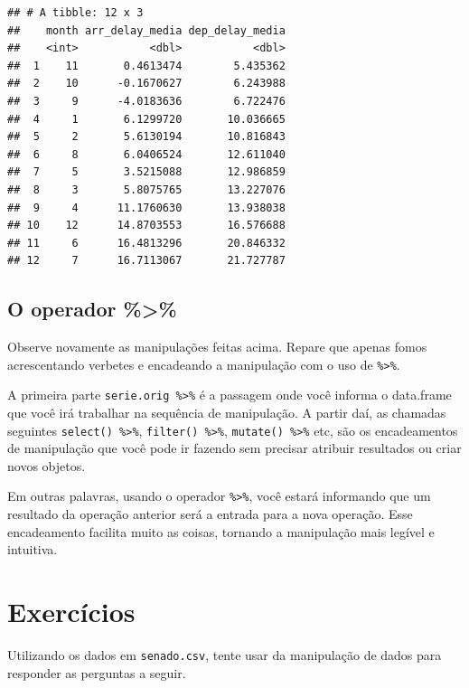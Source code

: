 \documentclass[]{book}
\begin{document}
\begin{verbatim}
## # A tibble: 12 x 3
##    month arr_delay_media dep_delay_media
##    <int>           <dbl>           <dbl>
##  1    11       0.4613474        5.435362
##  2    10      -0.1670627        6.243988
##  3     9      -4.0183636        6.722476
##  4     1       6.1299720       10.036665
##  5     2       5.6130194       10.816843
##  6     8       6.0406524       12.611040
##  7     5       3.5215088       12.986859
##  8     3       5.8075765       13.227076
##  9     4      11.1760630       13.938038
## 10    12      14.8703553       16.576688
## 11     6      16.4813296       20.846332
## 12     7      16.7113067       21.727787
\end{verbatim}

\subsection{O operador \%\textgreater{}\%}\label{o-operador}

Observe novamente as manipulações feitas acima. Repare que apenas fomos
acrescentando verbetes e encadeando a manipulação com o uso de
\texttt{\%\textgreater{}\%}.

A primeira parte \texttt{serie.orig\ \%\textgreater{}\%} é a passagem
onde você informa o data.frame que você irá trabalhar na sequência de
manipulação. A partir daí, as chamadas seguintes
\texttt{select()\ \%\textgreater{}\%},
\texttt{filter()\ \%\textgreater{}\%},
\texttt{mutate()\ \%\textgreater{}\%} etc, são os encadeamentos de
manipulação que você pode ir fazendo sem precisar atribuir resultados ou
criar novos objetos.

Em outras palavras, usando o operador \texttt{\%\textgreater{}\%}, você
estará informando que um resultado da operação anterior será a entrada
para a nova operação. Esse encadeamento facilita muito as coisas,
tornando a manipulação mais legível e intuitiva.

\section{Exercícios}\label{exercicios-3}

Utilizando os dados em \texttt{senado.csv}, tente usar da manipulação de
dados para responder as perguntas a seguir.
\end{document}
